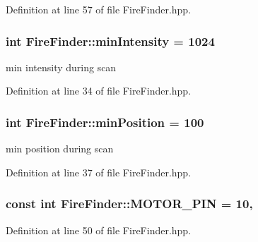 Definition at line 57 of file Fire\-Finder.\-hpp.

\hypertarget{classFireFinder_a7d3912a911843b60de3468588cfe8579}{
\subsubsection[{min\-Intensity}]{\setlength{\rightskip}{0pt plus 5cm}int Fire\-Finder\-::min\-Intensity = 1024\hspace{0.3cm}{\ttfamily [private]}}}\label{classFireFinder_a7d3912a911843b60de3468588cfe8579}


min intensity during scan 



Definition at line 34 of file Fire\-Finder.\-hpp.

\hypertarget{classFireFinder_ad8be0837d88f10d65b6f8a405f29494a}{
\subsubsection[{min\-Position}]{\setlength{\rightskip}{0pt plus 5cm}int Fire\-Finder\-::min\-Position = 100\hspace{0.3cm}{\ttfamily [private]}}}\label{classFireFinder_ad8be0837d88f10d65b6f8a405f29494a}


min position during scan 



Definition at line 37 of file Fire\-Finder.\-hpp.

\hypertarget{classFireFinder_ac29b178da56a9347787371708bb62a20}{
\subsubsection[{M\-O\-T\-O\-R\-\_\-\-P\-I\-N}]{\setlength{\rightskip}{0pt plus 5cm}const int Fire\-Finder\-::\-M\-O\-T\-O\-R\-\_\-\-P\-I\-N = 10\hspace{0.3cm}{\ttfamily [static]}, {\ttfamily [private]}}}\label{classFireFinder_ac29b178da56a9347787371708bb62a20}


Definition at line 50 of file Fire\-Finder.\-hpp.

